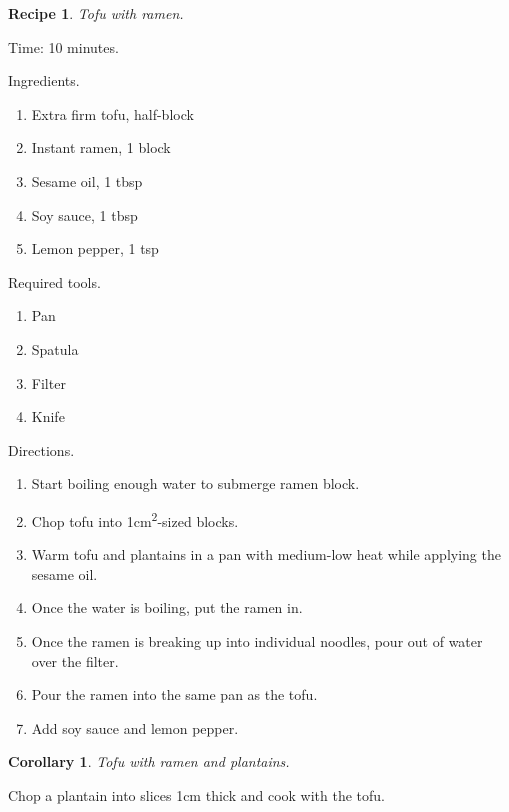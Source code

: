\documentclass[twocolumn]{amsart}
\newtheorem{rec}{Recipe}
\newtheorem{cor}{Corollary}
\begin{document}
\vspace{3em}

\begin{rec} Tofu with ramen. \end{rec}

Time: 10 minutes.

Ingredients.

\begin{enumerate}
	\item Extra firm tofu, half-block
	\item Instant ramen, 1 block
	\item Sesame oil, 1 tbsp
	\item Soy sauce, 1 tbsp
	\item Lemon pepper, 1 tsp
\end{enumerate}

Required tools.
\begin{enumerate}
	\item Pan
	\item Spatula
	\item Filter
	\item Knife
\end{enumerate}

Directions.

\begin{enumerate}
	\item Start boiling enough water to submerge ramen block.
	\item Chop tofu into 1cm\textsuperscript{2}-sized blocks.
	\item Warm tofu and plantains in a pan with medium-low heat while applying
		the sesame oil.
	\item Once the water is boiling, put the ramen in.
	\item Once the ramen is breaking up into individual noodles, pour out of
		water over the filter.
	\item Pour the ramen into the same pan as the tofu.
	\item Add soy sauce and lemon pepper.
\end{enumerate}

\vspace{1em}

\begin{cor} Tofu with ramen and plantains. \end{cor}
Chop a plantain into slices 1cm thick and cook with the tofu.

\vspace{3em}
\end{document}

